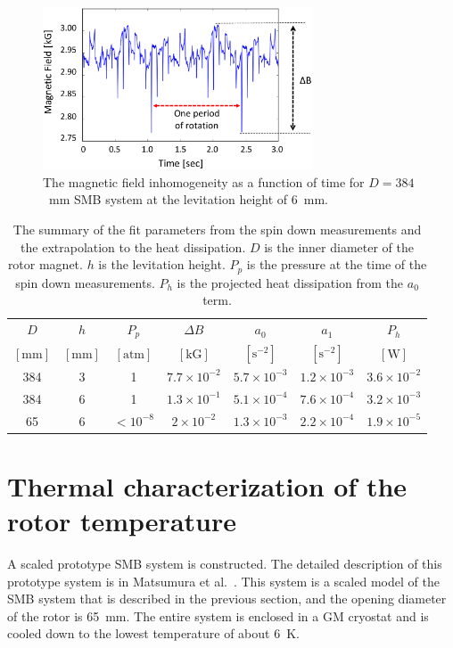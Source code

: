 \documentclass[journal]{IEEEtran}
\begin{document}
\begin{figure}[htb]
   \centering
   \includegraphics[width=80mm]{magneticfieldvariation_rev2.eps} %
   \caption{The magnetic field inhomogeneity as a function of time for $D=384$~mm SMB system at the levitation height of 6~mm. }
   \label{fig:Bval}
\end{figure}


\begin{table}[t]
   \centering
   \begin{tabular}{c|c|c|c|c|c|c} %
	    $D$ & $h$& $P_p$ & $\Delta B$ &$a_0$ & $a_1$  & $P_h$\\
	     $[\mbox{mm}]$ & $[\mbox{mm}]$ & $[\mbox{atm}]$ & $[\mbox{kG}]$ & $[\mbox{s}^{-2}]$  & $[\mbox{s}^{-2}]$  & $[\mbox{W}]$ \\ \hline
        384 & 3  & 1  & $7.7\times10^{-2}$ & $5.7\times10^{-3}$  & $1.2\times10^{-3}$ & $3.6\times10^{-2}$\\
	384 & 6  &  1 & $1.3\times10^{-1}$ & $5.1\times10^{-4}$ & $7.6\times10^{-4}$ & $3.2\times10^{-3}$\\
	65 & 6   &  $<10^{-8}$ & $2\times10^{-2}$ & $1.3\times10^{-3}$ & $2.2\times10^{-4}$ & $1.9\times10^{-5}$
   \end{tabular}
   \caption{The summary of the fit parameters from the spin down measurements and the extrapolation to the heat dissipation.
     $D$ is the inner diameter of the rotor magnet.
     $h$ is the levitation height.
     $P_p$ is the pressure at the time of the spin down measurements.
     $P_h$ is the projected heat dissipation from the $a_0$ term.}

   \label{tab:fitpar}
\end{table}

\section{Thermal characterization of the rotor temperature}
A scaled prototype SMB system is constructed.
The detailed description of this prototype system is in Matsumura et al.~\cite{matsumura_eucas2015}.
This system is a scaled model of the SMB system that is described in the previous section, and the opening diameter of the rotor is 65~mm.
The entire system is enclosed in a GM cryostat and is cooled down to the lowest temperature of about 6~K.
\end{document}
